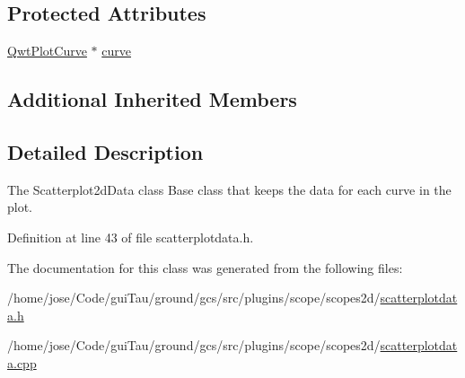 \subsection*{Protected Attributes}
\begin{DoxyCompactItemize}
\item 
\hyperlink{class_qwt_plot_curve}{Qwt\-Plot\-Curve} $\ast$ \hyperlink{group___scope_plugin_ga4a0647f875271067323cf2ad3868afa4}{curve}
\end{DoxyCompactItemize}
\subsection*{Additional Inherited Members}


\subsection{Detailed Description}
The Scatterplot2d\-Data class Base class that keeps the data for each curve in the plot. 

Definition at line 43 of file scatterplotdata.\-h.



The documentation for this class was generated from the following files\-:\begin{DoxyCompactItemize}
\item 
/home/jose/\-Code/gui\-Tau/ground/gcs/src/plugins/scope/scopes2d/\hyperlink{scatterplotdata_8h}{scatterplotdata.\-h}\item 
/home/jose/\-Code/gui\-Tau/ground/gcs/src/plugins/scope/scopes2d/\hyperlink{scatterplotdata_8cpp}{scatterplotdata.\-cpp}\end{DoxyCompactItemize}
